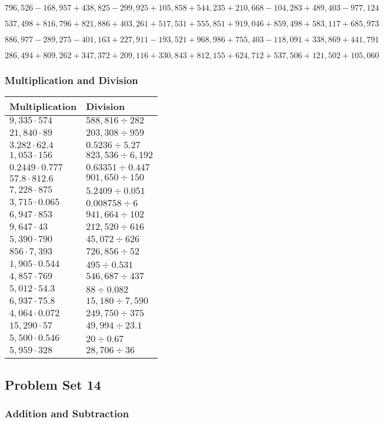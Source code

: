 \(796,526-168,957+438,825-299,925+105,858+544,235+210,668-104,283+489,403-977,124\)

\(537,498+816,796+821,886+403,261+517,531+555,851+919,046+859,498+583,117+685,973\)

\(886,977-289,275-401,163+227,911-193,521+968,986+755,403-118,091+338,869+441,791\)

\(286,494+809,262+347,372+209,116+330,843+812,155+624,712+537,506+121,502+105,060\)

\hypertarget{multiplication-and-division-317}{%
\subsubsection{Multiplication and
Division}\label{multiplication-and-division-317}}

\begin{longtable}[]{@{}ll@{}}
\toprule
Multiplication & Division\tabularnewline
\midrule
\endhead
\(9,335\cdot574\) & \(588,816÷282\)\tabularnewline
\(21,840\cdot89\) & \(203,308÷959\)\tabularnewline
\(3.282\cdot62.4\) & \(0.5236÷5.27\)\tabularnewline
\(1,053\cdot156\) & \(823,536÷6,192\)\tabularnewline
\(0.2449\cdot0.777\) & \(0.63351÷0.447\)\tabularnewline
\(57.8\cdot812.6\) & \(901,650÷150\)\tabularnewline
\(7,228\cdot875\) & \(5.2409÷0.051\)\tabularnewline
\(3,715\cdot0.065\) & \(0.008758÷6\)\tabularnewline
\(6,947\cdot853\) & \(941,664÷102\)\tabularnewline
\(9,647\cdot43\) & \(212,520÷616\)\tabularnewline
\(5,390\cdot790\) & \(45,072÷626\)\tabularnewline
\(856\cdot7,393\) & \(726,856÷52\)\tabularnewline
\(1,905\cdot0.544\) & \(495÷0.531\)\tabularnewline
\(4,857\cdot769\) & \(546,687÷437\)\tabularnewline
\(5,012\cdot54.3\) & \(88÷0.082\)\tabularnewline
\(6,937\cdot75.8\) & \(15,180÷7,590\)\tabularnewline
\(4,064\cdot0.072\) & \(249,750÷375\)\tabularnewline
\(15,290\cdot57\) & \(49,994÷23.1\)\tabularnewline
\(5,500\cdot0.546\) & \(20÷0.67\)\tabularnewline
\(5,959\cdot328\) & \(28,706÷36\)\tabularnewline
\bottomrule
\end{longtable}

\hypertarget{problem-set-14-5}{%
\subsection{Problem Set 14}\label{problem-set-14-5}}

\hypertarget{addition-and-subtraction-319}{%
\subsubsection{Addition and
Subtraction}\label{addition-and-subtraction-319}}

